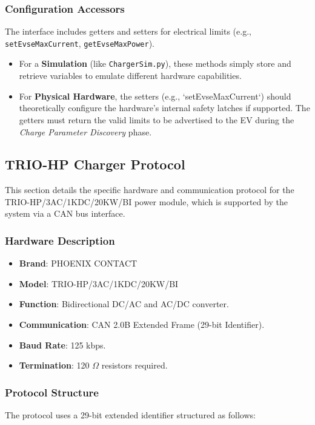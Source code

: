 \documentclass[a4paper,11pt]{report}
\begin{document}
\subsubsection{Configuration Accessors}
The interface includes getters and setters for electrical limits (e.g., \texttt{setEvseMaxCurrent}, \texttt{getEvseMaxPower}).
\begin{itemize}
    \item For a \textbf{Simulation} (like \texttt{ChargerSim.py}), these methods simply store and retrieve variables to emulate different hardware capabilities.
    \item For \textbf{Physical Hardware}, the setters (e.g., `setEvseMaxCurrent`) should theoretically configure the hardware's internal safety latches if supported. The getters must return the valid limits to be advertised to the EV during the \textit{Charge Parameter Discovery} phase.
\end{itemize}


\subsection{TRIO-HP Charger Protocol}
This section details the specific hardware and communication protocol for the TRIO-HP/\allowbreak 3AC/\allowbreak 1KDC/\allowbreak 20KW/\allowbreak BI power module, which is supported by the system via a CAN bus interface.

\subsubsection{Hardware Description}
\begin{itemize}
    \item \textbf{Brand}: PHOENIX CONTACT
    \item \textbf{Model}: TRIO-HP/3AC/1KDC/20KW/BI
    \item \textbf{Function}: Bidirectional DC/AC and AC/DC converter.
    \item \textbf{Communication}: CAN 2.0B Extended Frame (29-bit Identifier).
    \item \textbf{Baud Rate}: 125 kbps.
    \item \textbf{Termination}: 120 $\Omega$ resistors required.
\end{itemize}

\subsubsection{Protocol Structure}
The protocol uses a 29-bit extended identifier structured as follows:
\end{document}
